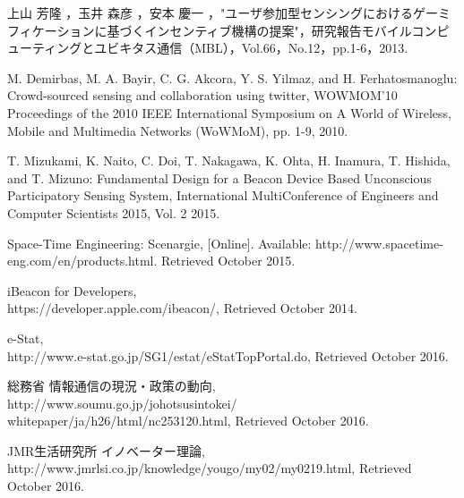 \documentclass[submit,techrep]{ipsj}
\begin{document}
\begin{thebibliography}{10}


上山 芳隆 ，玉井 森彦 ，安本 慶一 ，"ユーザ参加型センシングにおけるゲーミフィケーションに基づくインセンティブ機構の提案"，研究報告モバイルコンピューティングとユビキタス通信（MBL），Vol.66，No.12，pp.1-6，2013.

M. Demirbas, M. A. Bayir, C. G. Akcora, Y. S. Yilmaz, and H. Ferhatosmanoglu:
Crowd-sourced sensing and collaboration using twitter,
WOWMOM'10 Proceedings of the 2010 IEEE International Symposium on A World of Wireless, Mobile and Multimedia Networks (WoWMoM),
pp. 1-9, 2010.

T. Mizukami, K. Naito, C. Doi, T. Nakagawa, K. Ohta, H. Inamura, T. Hishida, and T. Mizuno:
Fundamental Design for a Beacon Device Based Unconscious Participatory Sensing System,
International MultiConference of Engineers and Computer Scientists 2015, Vol. 2 2015.

Space-Time Engineering: Scenargie, [Online]. Available: http://www.spacetime-eng.com/en/products.html. Retrieved October 2015.

iBeacon for Developers,\\https://developer.apple.com/ibeacon/,
Retrieved October 2014.

e-Stat,\\http://www.e-stat.go.jp/SG1/estat/eStatTopPortal.do,
Retrieved October 2016.

総務省 情報通信の現況・政策の動向,\\
http://www.soumu.go.jp/johotsusintokei/\\
whitepaper/ja/h26/html/nc253120.html,
Retrieved October 2016.

JMR生活研究所 イノベーター理論,\\
http://www.jmrlsi.co.jp/knowledge/yougo/my02/my0219.html,
Retrieved October 2016.


\end{thebibliography}
\end{document}
